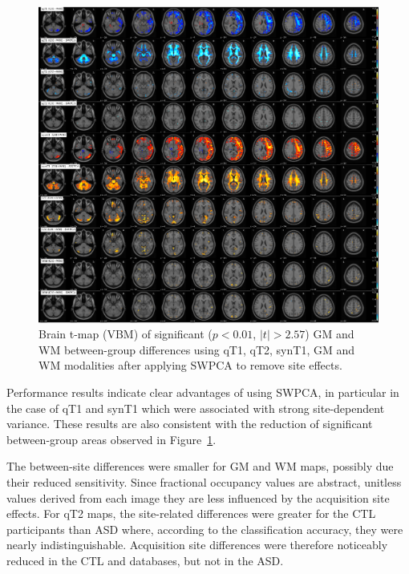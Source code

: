 \begin{figure}
	\centering
	\includegraphics[width=\linewidth]{Graphics/ch7/FIGURE03}
	\caption[Brain t-map (\acs{VBM}) of significant ($p<0.01$, $|t|>2.57$) \acs{GM} and \acs{WM} between-group differences using \acs{qT1}, \acs{qT2}, \acs{synT1}, \acs{GM} and \acs{WM} modalities after applying \acs{SWPCA} to remove site effects.]{Brain t-map (\ac{VBM}) of significant ($p<0.01$, $|t|>2.57$) \ac{GM} and \ac{WM} between-group differences using \ac{qT1}, \ac{qT2}, \ac{synT1}, \ac{GM} and \ac{WM} modalities after applying \ac{SWPCA} to remove site effects.}
	\label{fig:swpcaFIGURE03}
\end{figure}

Performance results indicate clear advantages of using \ac{SWPCA}, in particular in the case of \ac{qT1} and \ac{synT1} which were associated with strong site-dependent variance. These results are also consistent with the reduction of significant between-group areas observed in Figure~\ref{fig:swpcaFIGURE03}.
	
The between-site differences were smaller for \ac{GM} and \ac{WM} maps, possibly due their reduced sensitivity. Since fractional occupancy values are abstract, unitless values derived from each image they are less influenced by the acquisition site effects. For \ac{qT2} maps, the site-related differences were greater for the \ac{CTL} participants than \ac{ASD} where, according to the classification accuracy, they were nearly indistinguishable. Acquisition site differences were therefore noticeably reduced in the \ac{CTL} and \all{} databases, but not in the \ac{ASD}.

